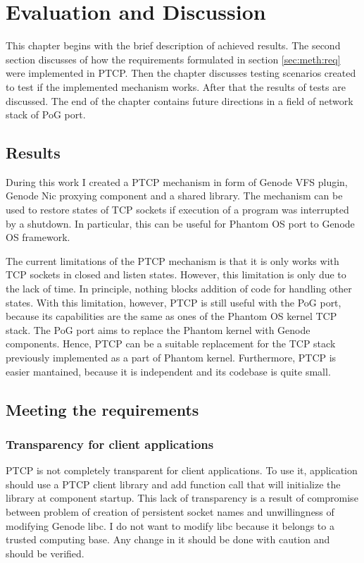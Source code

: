 \chapter{Evaluation and Discussion}
\label{chap:eval}

This chapter begins with the brief description of achieved results. The second
section discusses of how the requirements formulated in section
\ref{sec:meth:req} were implemented in PTCP. Then the chapter discusses testing
scenarios created to test if the implemented mechanism works. After that the
results of tests are discussed. The end of the chapter contains future
directions in a field of network stack of PoG port.

\section{Results}
\label{sec:eval:res}

During this work I created a PTCP mechanism in form of Genode VFS plugin,
Genode Nic proxying component and a shared library. The mechanism can be used
to restore states of TCP sockets if execution of a program was interrupted by a
shutdown. In particular, this can be useful for Phantom OS port to Genode OS
framework. 

The current limitations of the PTCP mechanism is that it is only works with
TCP sockets in closed and listen states. However, this limitation is only due
to the lack of time. In principle, nothing blocks addition of code for handling
other states. With this limitation, however, PTCP is still useful with the PoG
port, because its capabilities are the same as ones of the Phantom OS kernel
TCP stack. The PoG port aims to replace the Phantom kernel with Genode
components. Hence, PTCP can be a suitable replacement for the TCP stack
previously implemented as a part of Phantom kernel. Furthermore, PTCP is easier
mantained, because it is independent and its codebase is quite small.

\section{Meeting the requirements}

\subsection{Transparency for client applications}

PTCP is not completely transparent for client applications. To use it, 
application should use a PTCP client library and add function call that will
initialize the library at component startup. This lack of transparency is a
result of compromise between problem of creation of persistent socket names and
unwillingness of modifying Genode libc. I do not want to modify libc because it
belongs to a trusted computing base. Any change in it should be done with
caution and should be verified. 

